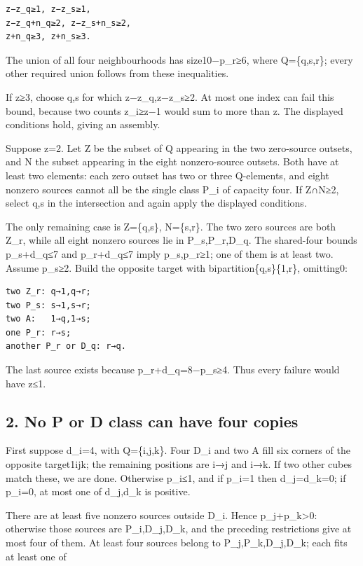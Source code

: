 \documentclass[
  10pt,
]{article}
\begin{document}
\begin{verbatim}
z−z_q≥1, z−z_s≥1,
z−z_q+n_q≥2, z−z_s+n_s≥2,
z+n_q≥3, z+n_s≥3.
\end{verbatim}

The union of all four neighbourhoods has size10−p\_r≥6, where
Q=\{q,s,r\}; every other required union follows from these inequalities.

If z≥3, choose q,s for which z−z\_q,z−z\_s≥2. At most one index can fail
this bound, because two counts z\_i≥z−1 would sum to more than z. The
displayed conditions hold, giving an assembly.

Suppose z=2. Let Z be the subset of Q appearing in the two zero-source
outsets, and N the subset appearing in the eight nonzero-source outsets.
Both have at least two elements: each zero outset has two or three
Q-elements, and eight nonzero sources cannot all be the single class
P\_i of capacity four. If \textbar Z∩N\textbar≥2, select q,s in the
intersection and again apply the displayed conditions.

The only remaining case is Z=\{q,s\}, N=\{s,r\}. The two zero sources
are both Z\_r, while all eight nonzero sources lie in P\_s,P\_r,D\_q.
The shared-four bounds p\_s+d\_q≤7 and p\_r+d\_q≤7 imply p\_s,p\_r≥1;
one of them is at least two. Assume p\_s≥2. Build the opposite target
with bipartition\{q,s\}\textbar\{1,r\}, omitting0:

\begin{verbatim}
two Z_r: q→1,q→r;
two P_s: s→1,s→r;
two A:   1→q,1→s;
one P_r: r→s;
another P_r or D_q: r→q.
\end{verbatim}

The last source exists because p\_r+d\_q=8−p\_s≥4. Thus every failure
would have z≤1.

\hypertarget{no-p-or-d-class-can-have-four-copies}{%
\subsection*{2. No P or D class can have four
copies}\label{no-p-or-d-class-can-have-four-copies}}

First suppose d\_i=4, with Q=\{i,j,k\}. Four D\_i and two A fill six
corners of the opposite target1i\textbar jk; the remaining positions are
i→j and i→k. If two other cubes match these, we are done. Otherwise
p\_i≤1, and if p\_i=1 then d\_j=d\_k=0; if p\_i=0, at most one of
d\_j,d\_k is positive.

There are at least five nonzero sources outside D\_i. Hence
p\_j+p\_k\textgreater0: otherwise those sources are P\_i,D\_j,D\_k, and
the preceding restrictions give at most four of them. At least four
sources belong to P\_j,P\_k,D\_j,D\_k; each fits at least one of
\end{document}
